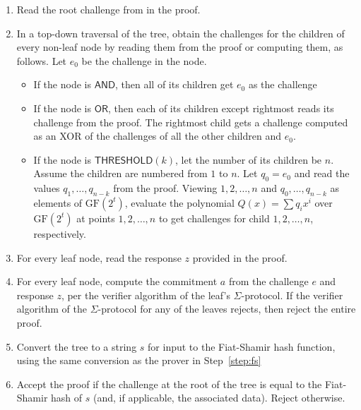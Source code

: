 \documentclass[11pt]{article}
\newcommand{\andnode}{\ensuremath{\mathsf{AND}}}
\newcommand{\ornode}{\ensuremath{\mathsf{OR}}}
\newcommand{\tnode}{\ensuremath{\mathsf{THRESHOLD}}}
\newcommand{\GF}{\ensuremath{\mathrm{GF}}}
\begin{document}
\begin{enumerate}
\item Read the root challenge from in the proof. 

\item In a top-down traversal of the tree, obtain the challenges for the children of every non-leaf node by reading them from the proof or computing them, as follows. Let $e_0$ be the challenge in the node. 
        \begin{itemize}
            \item If the node is $\andnode$,  then all of its children get $e_0$ as the challenge
            \item If the node is $\ornode$, then each of its children except rightmost reads its challenge from the proof. The rightmost child gets a challenge computed as an XOR of the challenges of all the other children and $e_0$.
            \item If the node is $\tnode(k)$, let the number of its children be $n$. Assume the children are numbered from $1$ to $n$. Let $q_0=e_0$ and read the values $q_1, \dots, q_{n-k}$ from the proof. Viewing $1, 2, \dots, n$ and $q_0, \dots, q_{n-k}$ as elements of $\GF(2^t)$, evaluate the polynomial $Q(x) = \sum {q_i x^i}$ over $\GF(2^t)$ at points $1, 2, \dots, n$ to get challenges for child $1, 2, \dots, n$, respectively. 
        \end{itemize}
        
 \item For every leaf node, read the response $z$ provided in the proof.

\item For every leaf node, compute the commitment $a$ from the challenge $e$ and response $z$, per the verifier algorithm of the leaf's $\Sigma$-protocol. If the verifier algorithm of the $\Sigma$-protocol for any of the leaves rejects, then reject the entire proof.

\item Convert the tree to a string $s$ for input to the Fiat-Shamir hash function, using the same conversion as the prover in Step~\ref{step:fs}

\item Accept the proof if the challenge at the root of the tree is equal to the Fiat-Shamir hash of $s$ (and, if applicable,  the associated data). Reject otherwise.
\end{enumerate}
\end{document}
